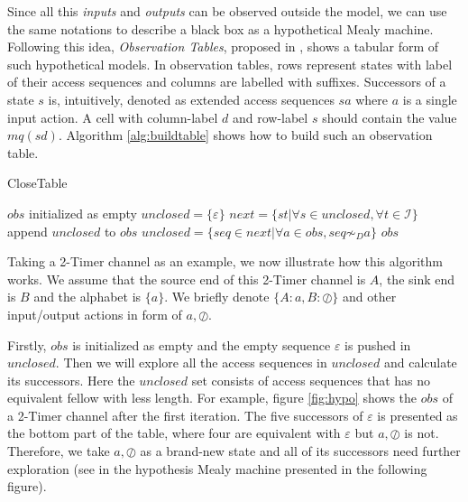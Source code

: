 \documentclass[conference, a4paper]{IEEEtran}
\newcommand{\rnoread}[0]{\oslash}
\begin{document}
Since all this \emph{inputs} and \emph{outputs} can be observed outside the
model, we can use the same notations to describe a black box as a hypothetical Mealy machine.
Following this idea, \emph{Observation Tables}, proposed in \cite{DBLP:journals/iandc/Angluin87},
shows a tabular form of such hypothetical models. In observation tables, rows represent states with
label of their access sequences and columns are labelled with suffixes. Successors of a state $s$ is,
intuitively, denoted as extended access sequences $sa$ where $a$ is a single input action. 
A cell with column-label $d$ and row-label $s$ should contain the value $mq(sd)$. Algorithm
\ref{alg:buildtable} shows how to build such an observation table.

\begin{algorithm} 
  \caption{CloseTable} 
  \label{alg:buildtable}
  \small
  $obs$ initialized as empty\;
  $unclosed=\{\varepsilon\}$\;
  {
    $next=\{st|\forall s\in unclosed,\forall t\in \mathcal{I}\}$\;
    append $unclosed$ to $obs$\;
    $unclosed=\{seq\in next|\forall a\in obs, seq \not\sim_D a\}$\;
  }
  \Return $obs$\; 
\end{algorithm}

Taking a 2-Timer channel as an example, we now illustrate how this algorithm works. 
We assume that the source end of this 2-Timer channel is $A$, the sink end is $B$ and the alphabet
is $\{a\}$. We briefly denote $\{A:a,B:\rnoread\}$ and other input/output actions in form of
$a,\rnoread$.

Firstly, $obs$ is initialized as empty and the empty sequence $\varepsilon$ is pushed in $unclosed$.
Then we will explore all the access sequences in $unclosed$ and calculate its successors. Here the
$unclosed$ set consists of access sequences that has no equivalent fellow with less length. 
For example, figure \ref{fig:hypo} shows the $obs$ of a 2-Timer channel after the first
iteration. The five successors of $\varepsilon$ is presented as the bottom part of the table, where
four are equivalent with $\varepsilon$ but $a,\rnoread$ is not. Therefore, we take $a,\rnoread$ as a
brand-new state and all of its successors need further exploration (see in the hypothesis Mealy
machine presented in the following figure).
\end{document}
